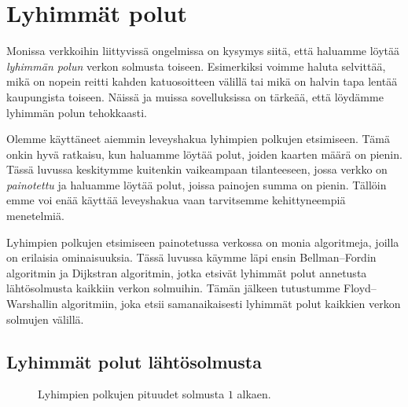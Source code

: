 \chapter{Lyhimmät polut}

Monissa verkkoihin liittyvissä ongelmissa on kysymys siitä,
että haluamme löytää \emph{lyhimmän polun} verkon solmusta toiseen.
Esimerkiksi voimme haluta selvittää,
mikä on nopein reitti kahden katuosoitteen välillä
tai mikä on halvin tapa lentää kaupungista toiseen.
Näissä ja muissa sovelluksissa on tärkeää,
että löydämme lyhimmän polun tehokkaasti.

Olemme käyttäneet aiemmin leveyshakua lyhimpien
polkujen etsimiseen.
Tämä onkin hyvä ratkaisu, kun haluamme löytää polut,
joiden kaarten määrä on pienin.
Tässä luvussa keskitymme kuitenkin vaikeampaan
tilanteeseen, jossa verkko on \emph{painotettu}
ja haluamme löytää polut,
joissa painojen summa on pienin.
Tällöin emme voi enää käyttää leveyshakua vaan
tarvitsemme kehittyneempiä menetelmiä.

Lyhimpien polkujen etsimiseen painotetussa verkossa
on monia algoritmeja, joilla on erilaisia ominaisuuksia.
Tässä luvussa käymme läpi ensin Bellman–Fordin algoritmin ja
Dijkstran algoritmin,
jotka etsivät lyhimmät polut annetusta lähtösolmusta
kaikkiin verkon solmuihin.
Tämän jälkeen tutustumme Floyd–Warshallin algoritmiin,
joka etsii samanaikaisesti lyhimmät polut kaikkien
verkon solmujen välillä.

\section{Lyhimmät polut lähtösolmusta}

\begin{figure}
\center
\begin{center}
\end{center}
\caption{Lyhimpien polkujen pituudet solmusta $1$ alkaen.}
\label{fig:lypola}
\end{figure}

